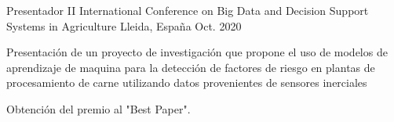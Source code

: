 

\begin{cventries}

  \cventry
    {Presentador} %
      {II International Conference on Big Data and Decision Support Systems in Agriculture} %
    {Lleida, España} %
    {Oct. 2020} %
    {
      \begin{cvitems} %
        \item {Presentación de un proyecto de investigación que propone el uso de modelos
        de aprendizaje de maquina para la detección de factores de riesgo en plantas de procesamiento de carne
        utilizando datos provenientes de sensores inerciales}
        \item {Obtención del premio al "Best Paper".}
      \end{cvitems}
    }

\end{cventries}
